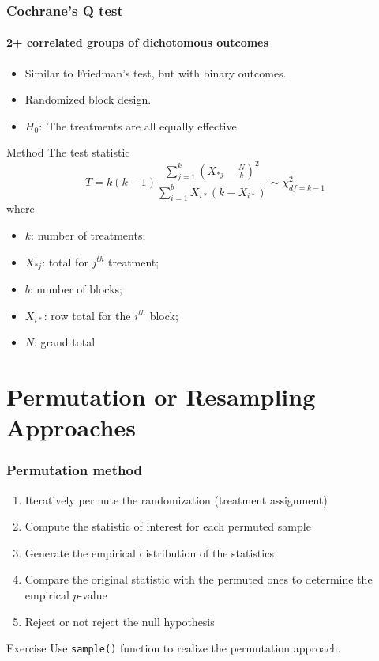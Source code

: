 \documentclass[table,10pt]{beamer}\usepackage[]{graphicx}\usepackage[]{color}
\begin{document}
\begin{CJK*}{UTF8}{gbsn}
\begin{frame}[t]
\frametitle{Cochrane's Q test}
\framesubtitle{2+ correlated groups of dichotomous outcomes}
\begin{itemize}
	\item Similar to Friedman's test, but with binary outcomes.
	\item Randomized block design.
	\item $H_0: $ The treatments are all equally effective.
\end{itemize}
\begin{block}{\center \small Method}
The test statistic
$$
T = k(k-1) \frac{\sum_{j=1}^k (X_{*j} - \frac{N}{k})^2}{\sum_{i=1}^b X_{i*}(k - X_{i*})} \sim \chi^2_{df=k-1}
$$
where
\begin{itemize}
	\item $k$: number of treatments;
	\item $X_{*j}$: total for $j^{th}$ treatment;
	\item $b$: number of blocks;
	\item $X_{i*}$: row total for the $i^{th}$ block;
	\item $N$: grand total
\end{itemize}
\end{block}
\end{frame}


\section{Permutation or Resampling Approaches}

\begin{frame}[t,containsverbatim]
\frametitle{Permutation method}
\begin{enumerate}
	\item Iteratively permute the randomization (treatment assignment)
	\item Compute the statistic of interest for each permuted sample
	\item Generate the empirical distribution of the statistics
	\item Compare the original statistic with the permuted ones to determine 
		the empirical $p$-value
	\item Reject or not reject the null hypothesis
\end{enumerate}
\begin{alertblock}{\center \small Exercise}
Use \texttt{sample()} function to realize the permutation approach.
\end{alertblock}
\end{frame}



\end{CJK*}
\end{document}
